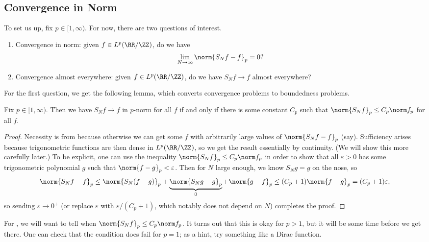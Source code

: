 \documentclass[../notes.tex]{subfiles}
\begin{document}
\subsection{Convergence in Norm}
To set us up, fix $p\in[1,\infty)$. For now, there are two questions of interest.
\begin{enumerate}
	\item Convergence in norm: given $f\in L^p(\RR/\ZZ)$, do we have
	\[\lim_{N\to\infty}\norm{S_Nf-f}_p=0?\]
	\item Convergence almost everywhere: given $f\in L^p(\RR/\ZZ)$, do we have $S_Nf\to f$ almost everywhere?
\end{enumerate}
For the first question, we get the following lemma, which converts convergence problems to boundedness problems.
\begin{lemma} \label{lem:p-conv-is-p-bounded}
	Fix $p\in[1,\infty)$. Then we have $S_Nf\to f$ in $p$-norm for all $f$ if and only if there is some constant $C_p$ such that $\norm{S_Nf}_p\le C_p\norm f_p$ for all $f$.
\end{lemma}
\begin{proof}
	Necessity is from  because otherwise we can get some $f$ with arbitrarily large values of $\norm{S_Nf-f}_p$ (say). Sufficiency arises because trigonometric functions are then dense in $L^p(\RR/\ZZ)$, so we get the result essentially by continuity. (We will show this more carefully later.) To be explicit, one can use the inequality $\norm{S_Nf}_p\le C_p\norm f_p$ in order to show that all $\varepsilon>0$ has some trigonometric polynomial $g$ such that $\norm{f-g}_p<\varepsilon$. Then for $N$ large enough, we know $S_Ng=g$ on the nose, so
	\[\norm{S_Nf-f}_p\le\norm{S_N(f-g)}_p+\underbrace{\norm{S_Ng-g}_p}_0+\norm{g-f}_p\le (C_p+1)\norm{f-g}_p=(C_p+1)\varepsilon,\]
	so sending $\varepsilon\to0^+$ (or replace $\varepsilon$ with $\varepsilon/(C_p+1)$, which notably does not depend on $N$) completes the proof.
\end{proof}
For , we will want to tell when $\norm{S_Nf}_p\le C_p\norm f_p$. It turns out that this is okay for $p>1$, but it will be some time before we get there. One can check that the condition does fail for $p=1$; as a hint, try something like a Dirac function.
\end{document}
